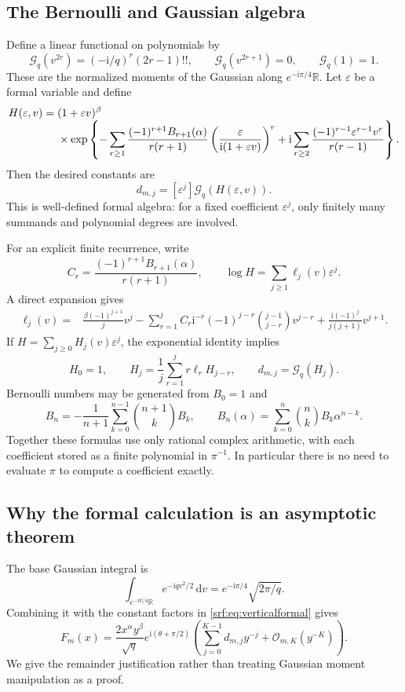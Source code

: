 \documentclass[11pt]{article}
\theoremstyle{remark}\newtheorem{remark}[theorem]{Remark}
\newcommand{\eps}{\varepsilon}
\newcommand{\OO}{\mathcal O}
\newcommand{\R}{\mathbb R}
\newcommand{\ii}{\mathrm i}
\newcommand{\dd}{\,\mathrm d}
\newcommand{\G}{\mathcal G}
\begin{document}
\subsection{The Bernoulli and Gaussian algebra}
Define a linear functional on polynomials by
\begin{equation}\label{srf:eq:G}
 \G_q(v^{2r})=(-\ii/q)^r(2r-1)!!,\qquad
 \G_q(v^{2r+1})=0,\qquad \G_q(1)=1.
\end{equation}
These are the normalized moments of the Gaussian along $e^{-\ii\pi/4}\R$. Let $\eps$ be a formal variable and define
\begin{align}
 H(\eps,v)={}&(1+\eps v)^\beta\notag\\[-4pt]
 &\times\exp\left\{-\sum_{r\ge1}
 \frac{(-1)^{r+1}B_{r+1}(\alpha)}{r(r+1)}
       \left(\frac{\eps}{\ii(1+\eps v)}\right)^r
 +\ii\sum_{r\ge2}\frac{(-1)^{r-1}\eps^{r-1}v^r}{r(r-1)}\right\}.\label{srf:eq:H}
\end{align}
Then the desired constants are
\begin{equation}\label{srf:eq:dgen}
 d_{m,j}=[\eps^j]\G_q(H(\eps,v)).
\end{equation}
This is well-defined formal algebra: for a fixed coefficient $\eps^j$, only finitely many summands and polynomial degrees are involved.

For an explicit finite recurrence, write
\[
 C_r=\frac{(-1)^{r+1}B_{r+1}(\alpha)}{r(r+1)},\qquad
 \log H=\sum_{j\ge1}\ell_j(v)\eps^j.
\]
A direct expansion gives
\begin{align}
 \ell_j(v)={}&\frac{\beta(-1)^{j+1}}j v^j
 -\sum_{r=1}^j C_r\ii^{-r}(-1)^{j-r}
                 \binom{j-1}{j-r}v^{j-r}
 +\frac{\ii(-1)^j}{j(j+1)}v^{j+1}.\label{srf:eq:ell}
\end{align}
If $H=\sum_{j\ge0}H_j(v)\eps^j$, the exponential identity implies
\begin{equation}\label{srf:eq:Hrec}
 H_0=1,\qquad H_j=\frac1j\sum_{r=1}^j r\ell_rH_{j-r},\qquad
 d_{m,j}=\G_q(H_j).
\end{equation}
Bernoulli numbers may be generated from $B_0=1$ and
\[
 B_n=-\frac1{n+1}\sum_{k=0}^{n-1}\binom{n+1}{k}B_k,
 \qquad B_n(\alpha)=\sum_{k=0}^n\binom nkB_k\alpha^{n-k}.
\]
Together these formulas use only rational complex arithmetic, with each coefficient stored as a finite polynomial in $\pi^{-1}$. In particular there is no need to evaluate $\pi$ to compute a coefficient exactly.

\subsection{Why the formal calculation is an asymptotic theorem}
The base Gaussian integral is
\[
 \int_{e^{-\ii\pi/4}\R}e^{-\ii qv^2/2}\dd v
       =e^{-\ii\pi/4}\sqrt{2\pi/q}.
\]
Combining it with the constant factors in \eqref{srf:eq:verticalformal} gives
\begin{equation}\label{srf:eq:Fexpansion}
 F_m(x)=\frac{2x^\alpha y^\beta}{\sqrt q}
          e^{\ii(\theta+\pi/2)}
       \left(\sum_{j=0}^{K-1}d_{m,j}y^{-j}
                        +\OO_{m,K}(y^{-K})\right).
\end{equation}
We give the remainder justification rather than treating Gaussian moment manipulation as a proof.
\end{document}
